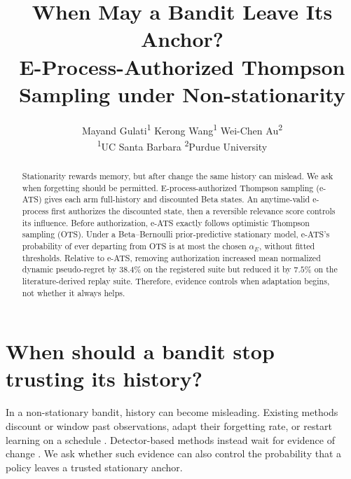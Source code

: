\documentclass{article}
\title{When May a Bandit Leave Its Anchor?\\
E-Process-Authorized Thompson Sampling under Non-stationarity}
\author{%
  Mayand Gulati\textsuperscript{1} \quad
  Kerong Wang\textsuperscript{1} \quad
  Wei-Chen Au\textsuperscript{2} \\
  \textsuperscript{1}UC Santa Barbara \qquad
  \textsuperscript{2}Purdue University \\
}
\newcommand{\method}{e-ATS}
\newcommand{\anchor}{OTS}
\newcommand{\1}{\mathbf 1}
\newcommand{\alphaE}{\alpha_E}
\begin{document}
\frenchspacing
\maketitle
\begin{abstract}
Stationarity rewards memory, but after change the same history can mislead.
We ask when forgetting should be permitted.
E-process-authorized Thompson
sampling (\method{}) gives each arm full-history and discounted Beta
states.
An anytime-valid e-process first authorizes the discounted
state, then a reversible relevance score controls its influence.
Before authorization, \method{} exactly follows optimistic Thompson sampling
(\anchor{}). Under a Beta--Bernoulli prior-predictive stationary model, \method{}'s
probability of ever departing from \anchor{} is at most the chosen $\alphaE$,
without fitted thresholds.
Relative to \method{}, removing authorization increased mean normalized
dynamic pseudo-regret by $38.4\%$ on the registered suite but reduced it
by $7.5\%$ on the literature-derived replay suite.
Therefore, evidence controls when
adaptation begins, not whether it always helps.
\end{abstract}

\section{When should a bandit stop trusting its history?}

In a non-stationary bandit, history can become misleading. Existing methods
discount or window past observations, adapt their forgetting rate, or restart
learning on a schedule
\citep{garivier2008ucb,raj2017taming,lu2017adaptive,besbes2014rexp3,
russac2019weighted,fiandri2024swts}. Detector-based methods instead wait for
evidence of change \citep{cao2018mucb,liu2017cusum,besson2022glr}. We ask
whether such evidence can also control the probability that a policy leaves a
trusted stationary anchor.
\end{document}
